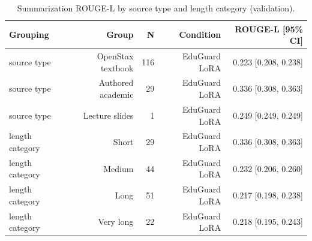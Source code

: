 \begin{table}[t]
\centering
\caption{Summarization ROUGE-L by source type and length category (validation).}
\label{tab:t5_summarization_breakdown}
\begin{tabular}{lrrrr}
\toprule
Grouping & Group & N & Condition & ROUGE-L [95\% CI] \\
\midrule
source type & OpenStax textbook & 116 & EduGuard LoRA & 0.223 [0.208, 0.238] \\
source type & Authored academic & 29 & EduGuard LoRA & 0.336 [0.308, 0.363] \\
source type & Lecture slides & 1 & EduGuard LoRA & 0.249 [0.249, 0.249] \\
length category & Short & 29 & EduGuard LoRA & 0.336 [0.308, 0.363] \\
length category & Medium & 44 & EduGuard LoRA & 0.232 [0.206, 0.260] \\
length category & Long & 51 & EduGuard LoRA & 0.217 [0.198, 0.238] \\
length category & Very long & 22 & EduGuard LoRA & 0.218 [0.195, 0.243] \\
\bottomrule
\end{tabular}
\end{table}
